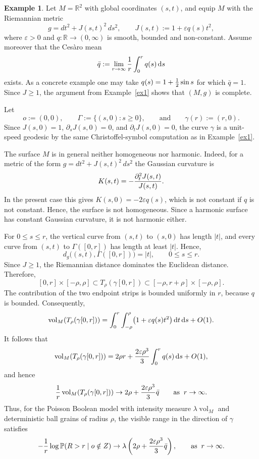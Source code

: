 \documentclass[11pt,a4paper]{article}
\theoremstyle{plain}
\theoremstyle{definition}
\newtheorem{example}[theorem]{Example}
\theoremstyle{remark}
\newcommand{\dint}{\textup{d}}
\newcommand{\vol}{\mathop{\mathrm{vol}}\nolimits}
\def\PP{\mathbb{P}}
\def\RR{\mathbb{R}}
\begin{document}
\begin{example}\label{ex2}
	Let \(M=\RR^2\) with global coordinates \((s,t)\), and equip \(M\) with the
	Riemannian metric
	\[
	g=dt^2+J(s,t)^2\,ds^2,
	\qquad
	J(s,t):=1+\varepsilon q(s)t^2,
	\]
	where \(\varepsilon>0\) and \(q:\RR\to(0,\infty)\) is smooth, bounded and
	non-constant. Assume moreover that the Cesàro mean
	\[
	\bar q
	:=
	\lim_{r\to\infty}{1\over r}\int_0^r q(s)\,\dint s
	\]
	exists. As a concrete example one may take $q(s)=1+{1\over 2}\sin s$ for which $\bar q=1$. Since \(J\geq1\), the argument from Example~\ref{ex1} shows that
	\((M,g)\) is complete.
	
	Let
	\[
	o:=(0,0),
	\qquad
	\Gamma:=\{(s,0):s\geq0\},
	\qquad\text{and}\qquad
	\gamma(r):=(r,0).
	\]
	Since \(J(s,0)=1\), \(\partial_sJ(s,0)=0\), and
	\(\partial_tJ(s,0)=0\), the curve \(\gamma\) is a unit-speed geodesic by the
	same Christoffel-symbol computation as in Example~\ref{ex1}.
	
	The surface $M$ is in general neither homogeneous nor harmonic. Indeed, for a
	metric of the form $g=dt^2+J(s,t)^2\,ds^2$
	the Gaussian curvature is
	\[
	K(s,t)=-{\partial_t^2J(s,t)\over J(s,t)}.
	\]
	In the present case this gives $K(s,0)=-2\varepsilon q(s)$,
	which is not constant if \(q\) is not constant. Hence, the surface is not
	homogeneous. Since a harmonic surface has constant Gaussian curvature, it is
	not harmonic either.
	
	For \(0\leq s\leq r\), the vertical curve from \((s,t)\) to \((s,0)\) has
	length \(|t|\), and every curve from \((s,t)\) to \(\Gamma([0,r])\) has length
	at least \(|t|\). Hence,
	\[
	d_g\bigl((s,t),\Gamma([0,r])\bigr)=|t|,
	\qquad 0\leq s\leq r.
	\]
	Since \(J\geq1\), the Riemannian distance dominates the Euclidean distance.
	Therefore,
	\[
	[0,r]\times[-\rho,\rho]
	\subset
	T_\rho(\gamma[0,r])
	\subset
	[-\rho,r+\rho]\times[-\rho,\rho].
	\]
	The contribution of the two endpoint strips is bounded uniformly in \(r\),
	because \(q\) is bounded. Consequently,
	\[
	\vol_M(T_\rho(\gamma[0,r]))
	=
	\int_0^r\int_{-\rho}^{\rho}
	\bigl(1+\varepsilon q(s)t^2\bigr)\,\dint t\,\dint s
	+
	O(1).
	\]
	It follows that
	\[
	\vol_M(T_\rho(\gamma[0,r]))
	=
	2\rho r
	+
	{2\varepsilon\rho^3\over3}
	\int_0^r q(s)\,\dint s
	+
	O(1),
	\]
	and hence
	\[
	{1\over r}\vol_M(T_\rho(\gamma[0,r]))
	\to
	2\rho+{2\varepsilon\rho^3\over3}\bar q \qquad\text{as}\;\; r\to\infty.
	\]
	Thus, for the Poisson Boolean model with intensity measure
	\(\lambda\vol_M\) and deterministic ball grains of radius $\rho$, the visible range in the direction of \(\gamma\) satisfies
	\[
	-\frac{1}{r}\log \PP(R>r\mid o\notin Z)
	\to
	\lambda\left(2\rho+{2\varepsilon\rho^3\over3}\bar q\right),\qquad\text{as}\;\; r\to\infty.
	\]
\end{example}
\end{document}
